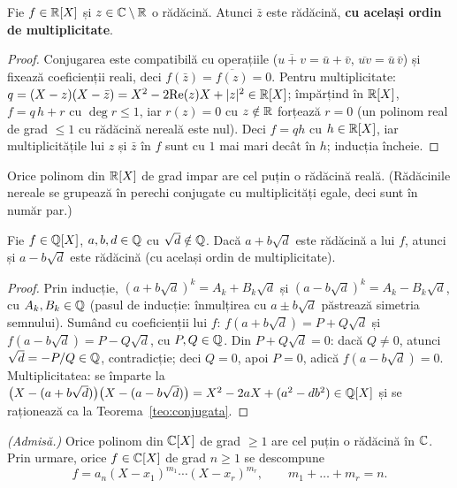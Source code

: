\begin{teorema}\label{teo:conjugata}
Fie $f\in\mathbb{R}[X]$ și $z\in\mathbb{C}\setminus\mathbb{R}$ o rădăcină. Atunci $\bar z$ este rădăcină, \textbf{cu același ordin de multiplicitate}.
\end{teorema}

\begin{proof}
Conjugarea este compatibilă cu operațiile ($\overline{u+v}=\bar u+\bar v$, $\overline{uv}=\bar u\,\bar v$) și fixează coeficienții reali, deci $f(\bar z)=\overline{f(z)}=0$. Pentru multiplicitate: $q=(X-z)(X-\bar z)=X^2-2\mathrm{Re}(z)X+|z|^2\in\mathbb{R}[X]$; împărțind în $\mathbb{R}[X]$, $f=q\,h+r$ cu $\deg r\le1$, iar $r(z)=0$ cu $z\notin\mathbb{R}$ forțează $r=0$ (un polinom real de grad $\le1$ cu rădăcină nereală este nul). Deci $f=qh$ cu $h\in\mathbb{R}[X]$, iar multiplicitățile lui $z$ și $\bar z$ în $f$ sunt cu $1$ mai mari decât în $h$; inducția încheie.
\end{proof}

\begin{corolar}
Orice polinom din $\mathbb{R}[X]$ de grad impar are cel puțin o rădăcină reală. (Rădăcinile nereale se grupează în perechi conjugate cu multiplicități egale, deci sunt în număr par.)
\end{corolar}

\begin{teorema}\label{teo:conjpatratica}
Fie $f\in\mathbb{Q}[X]$, $a,b,d\in\mathbb{Q}$ cu $\sqrt d\notin\mathbb{Q}$. Dacă $a+b\sqrt d$ este rădăcină a lui $f$, atunci și $a-b\sqrt d$ este rădăcină (cu același ordin de multiplicitate).
\end{teorema}

\begin{proof}
Prin inducție, $(a+b\sqrt d)^k=A_k+B_k\sqrt d$ și $(a-b\sqrt d)^k=A_k-B_k\sqrt d$, cu $A_k,B_k\in\mathbb{Q}$ (pasul de inducție: înmulțirea cu $a\pm b\sqrt d$ păstrează simetria semnului). Sumând cu coeficienții lui $f$: $f(a+b\sqrt d)=P+Q\sqrt d$ și $f(a-b\sqrt d)=P-Q\sqrt d$, cu $P,Q\in\mathbb{Q}$. Din $P+Q\sqrt d=0$: dacă $Q\neq0$, atunci $\sqrt d=-P/Q\in\mathbb{Q}$, contradicție; deci $Q=0$, apoi $P=0$, adică $f(a-b\sqrt d)=0$. Multiplicitatea: se împarte la $\bigl(X-(a+b\sqrt d)\bigr)\bigl(X-(a-b\sqrt d)\bigr)=X^2-2aX+(a^2-db^2)\in\mathbb{Q}[X]$ și se raționează ca la Teorema~\ref{teo:conjugata}.
\end{proof}

\begin{teorema}\label{teo:tfa}
\emph{(Admisă.)} Orice polinom din $\mathbb{C}[X]$ de grad $\ge1$ are cel puțin o rădăcină în $\mathbb{C}$. Prin urmare, orice $f\in\mathbb{C}[X]$ de grad $n\ge 1$ se descompune
\[
f=a_n(X-x_1)^{m_1}\cdots(X-x_r)^{m_r},\qquad m_1+\dots+m_r=n.
\]
\end{teorema}


